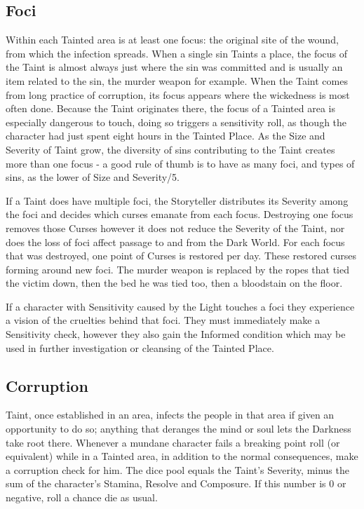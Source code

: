\subsection*{Foci}

Within each Tainted area is at least one focus: the original site of the wound, from which the infection spreads. When a single sin Taints a place, the focus of the Taint is almost always just where the sin was committed and is usually an item related to the sin, the murder weapon for example. When the Taint comes from long practice of corruption, its focus appears where the wickedness is most often done. Because the Taint originates there, the focus of a Tainted area is especially dangerous to touch, doing so triggers a sensitivity roll, as though the character had just spent eight hours in the Tainted Place. As the Size and Severity of Taint grow, the diversity of sins contributing to the Taint creates more than one focus - a good rule of thumb is to have as many foci, and types of sins, as the lower of Size and Severity/5. 

If a Taint does have multiple foci, the Storyteller distributes its Severity among the foci and decides which curses emanate from each focus. Destroying 
one focus removes those Curses however it does not reduce the Severity of the Taint, nor does the loss of foci affect passage to and from the Dark World. For each focus that was destroyed, one point of Curses is restored per day. These restored curses forming around new foci. The murder weapon is replaced by the ropes that tied the victim down, then the bed he was tied too, then a bloodstain on the floor. 

If a character with Sensitivity caused by the Light touches a foci they experience a vision of the cruelties behind that foci. They must immediately make a Sensitivity check, however they also gain the Informed condition which may be used in further investigation or cleansing of the Tainted Place. 

\subsection*{Corruption}


Taint, once established in an area, infects the people in that area if given an opportunity to do so; anything that deranges the mind or soul lets the Darkness take root there. Whenever a mundane character fails a breaking point roll (or equivalent) while in a Tainted area, in addition to the normal consequences, make a corruption check for him. The dice pool equals the Taint’s Severity, minus the sum of the character’s Stamina, Resolve and Composure. If this number is 0 or negative, roll a chance die as usual.

